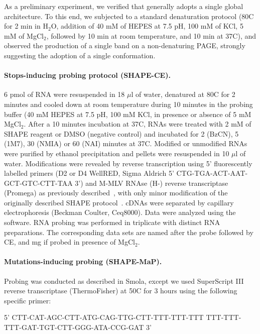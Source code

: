 \documentclass[a4,center,fleqn]{NAR}
\begin{document}
As a preliminary experiment, we verified that \didy{} generally adopts a single global architecture. To this end, we subjected \didy{} to a standard denaturation protocol (80\degree{}C for 2 min in H$_\text{2}$O, addition of 40 mM of HEPES at 7.5 pH, 100 mM of KCl, 5 mM of MgCl$_\text{2}$, followed by 10 min at room temperature, and 10 min at 37\degree{}C), and observed the production of a single band on a non-denaturing PAGE, strongly suggesting the adoption of a single conformation.

\paragraph{Stops-inducing probing protocol (SHAPE-CE).} 
6 pmol of RNA were resuspended in 18 $\mu$l of water, denatured at 80\degree{}C for 2 minutes and cooled down at room temperature during 10 minutes in the probing buffer (40 mM HEPES at 7.5 pH, 100 mM KCl, in presence or absence of 5 mM MgCl$_\text{2}$. After a 10 minutes incubation at 37\degree{}C, RNAs were treated with 2 mM of SHAPE reagent or DMSO (negative control) and incubated for 2 (BzCN), 5 (1M7), 30 (NMIA) or 60 (NAI) minutes at 37\degree{}C. Modified or unmodified RNAs were purified by ethanol precipitation and pellets were resuspended in 10 $\mu$l of water.
Modifications were revealed by reverse transcription using 5' fluorescently labelled primers (D2 or D4 WellRED, Sigma Aldrich 5' CTG-TGA-ACT-AAT-GCT-GTC-CTT-TAA 3') and M-MLV RNAse (H-) reverse transcriptase (Promega) as previously described~\cite{Deforges2017}, with only minor modification of the originally described SHAPE protocol~\cite{Wilkinson2006}. cDNAs were separated by capillary electrophoresis (Beckman Coulter, Ceq8000). Data were analyzed using the  ~\cite{Karabiber2013} software. RNA probing was performed in triplicate with distinct RNA preparations. The corresponding data sets are named after the probe followed by {\sc CE}, and {\sc mg} if probed in presence of MgCl$_\text{2}$.

\paragraph{Mutations-inducing probing (SHAPE-MaP).}
Probing was conducted as described in Smola\etal\cite{Smola2015}, except we used SuperScript III reverse transcriptase (ThermoFisher) at 50\degree{}C for 3 hours using the following specific primer: 

{\centering {}%
5' CTT-CAT-AGC-CTT-ATG-CAG-TTG-CTT-TTT-TTT-TTT
   TTT-TTT-TTT-GAT-TGT-CTT-GGG-ATA-CCG-GAT 3'\\}
\end{document}
